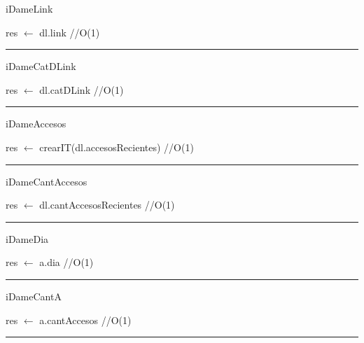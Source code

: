 \begin{algorithm}[H]
\caption{iDameLink}
\begin{algorithmic}[1]
\state res $\gets$ dl.link \hfill //O(1)
\EndFunction 
\end{algorithmic}
\hrule
{}
\end{algorithm}

\begin{algorithm}[H]
\caption{iDameCatDLink}
\begin{algorithmic}[1]
\state res $\gets$ dl.catDLink \hfill //O(1)
\EndFunction 
\end{algorithmic}
\hrule
{}
\end{algorithm}

\begin{algorithm}[H]
\caption{iDameAccesos}
\begin{algorithmic}[1]
\state res $\gets$ crearIT(dl.accesosRecientes) \hfill //O(1)
\EndFunction 
\end{algorithmic}
\hrule
{}
\end{algorithm}

\begin{algorithm}[H]
\caption{iDameCantAccesos}
\begin{algorithmic}[1]
\state res $\gets$ dl.cantAccesosRecientes \hfill //O(1)
\EndFunction 
\end{algorithmic}
\hrule
{}
\end{algorithm}

\begin{algorithm}[H]
\caption{iDameDia}
\begin{algorithmic}[1]
\state res $\gets$ a.dia \hfill //O(1)
\EndFunction 
\end{algorithmic}
\hrule
{}
\end{algorithm}

\begin{algorithm}[H]
\caption{iDameCantA}
\begin{algorithmic}[1]
\state res $\gets$ a.cantAccesos \hfill //O(1)
\EndFunction 
\end{algorithmic}
\hrule
{}
\end{algorithm}

